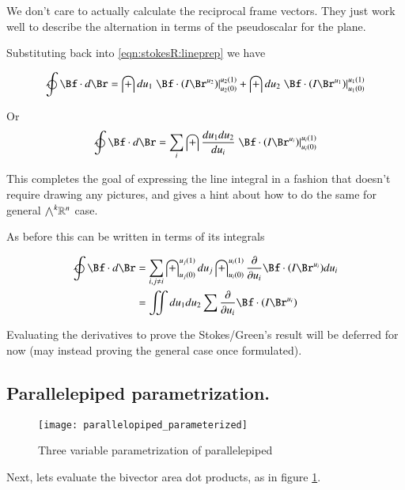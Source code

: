 We don't care to actually calculate the reciprocal frame vectors.  They just work well to describe the alternation in terms of the pseudoscalar for the plane.

Substituting back into \ref{eqn:stokesR:lineprep} we have

\begin{align*}
\ointclockwise \Bf \cdot d\Br
&=
\int du_1 \left.{\Bf \cdot \left(I \Br^{u_2}\right) }\right\vert_{u_2(0)}^{u_2(1)}
+\int du_2 \left.{\Bf \cdot \left(I \Br^{u_1}\right) }\right\vert_{u_1(0)}^{u_1(1)} \\
\end{align*}

Or
\begin{equation}\label{eqn:stokesR:lineintegral}
\ointclockwise \Bf \cdot d\Br
=
\sum_{i} \int \frac{du_1 du_2}{du_i} \left.{\Bf \cdot \left(I \Br^{u_i}\right) }\right\vert_{u_i(0)}^{u_i(1)}
\end{equation}

This completes the goal of expressing the line integral in a fashion that doesn't require drawing any pictures,
and gives a hint about how to do the same for general ${\bigwedge}^k \mathbb{R}^{n}$ case.

As before this can be written in terms of its integrals

\begin{align*}
\ointclockwise \Bf \cdot d\Br
&= \sum_{i, j \ne i} 
\int_{u_j(0)}^{u_j(1)} du_j
\int_{u_i(0)}^{u_i(1)}
 \PD{u_i}{} {\Bf \cdot \left(I \Br^{u_i}\right)} du_i \\
&= \iint du_1 du_2 \sum \PD{u_i}{} {\Bf \cdot \left(I \Br^{u_i}\right)}
\end{align*}

Evaluating the derivatives to prove the Stokes/Green's result will be deferred for now (may instead proving
the general case once formulated).

\subsection{Parallelepiped parametrization. }

\begin{figure}[htp]
\centering
\texttt{[image: parallelopiped\_parameterized]}
\caption{Three variable parametrization of  parallelepiped}\label{fig:parallelopiped}
\end{figure}

Next, lets evaluate the bivector area dot products, as in figure \ref{fig:parallelopiped}.

